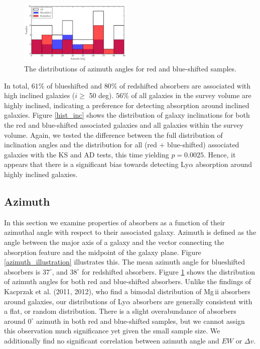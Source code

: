 \documentclass[iop]{emulateapj-rtx4}
\begin{document}
\begin{figure}[ht!]
        \centering
        \includegraphics[width=0.48\textwidth]{hist(azimuth)_overlaid_all.pdf}
        \caption{\small{The distributions of azimuth angles for red and blue-shifted samples.}}
        \label{azimuth_dist}
        \vspace{5pt}
\end{figure} 

In total, $61\%$ of blueshifted and $80\%$ of redshifted absorbers are associated with high inclined galaxies ($i \geq$ 50 deg). $56\%$ of all galaxies in the survey volume are highly inclined, indicating a preference for detecting absorption around inclined galaxies. Figure \ref{hist_inc} shows the distribution of galaxy inclinations for both the red and blue-shifted associated galaxies and all galaxies within the survey volume. Again, we tested the difference between the full distribution of inclination angles and the distribution for all (red + blue-shifted) associated galaxies with the KS and AD tests, this time yielding $p=0.0025$. Hence, it appears that there is a significant bias towards detecting Ly$\alpha$ absorption around highly inclined galaxies. 


\subsection{Azimuth}
In this section we examine properties of absorbers as a function of their azimuthal angle with respect to their associated galaxy. Azimuth is defined as the angle between the major axis of a galaxy and the vector connecting the absorption feature and the midpoint of the galaxy plane. Figure \ref{azimuth_illustration} illustrates this. The mean azimuth angle for blueshifted absorbers is $37^{\circ}$, and $38^{\circ}$ for redshifted absorbers. Figure \ref{azimuth_dist} shows the distribution of azimuth angles for both red and blue-shifted absorbers. Unlike the findings of Kacprzak et al. (2011, 2012), who find a bimodal distribution of Mg\,{\sc ii} absorbers around galaxies, our distributions of Ly$\alpha$ absorbers are generally consistent with a flat, or random distribution. There is a slight overabundance of absorbers around $0^{\circ}$ azimuth in both red and blue-shifted samples, but we cannot assign this observation much significance yet given the small sample size. We additionally find no significant correlation between azimuth angle and $EW$ or $\Delta v$. 
\end{document}
